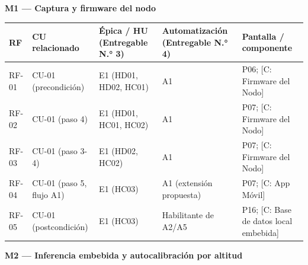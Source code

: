\documentclass[11pt,a4paper]{article}
\begin{document}
\textbf{M1 --- Captura y firmware del nodo}

{\small
\begin{longtable}[]{@{}
  >{\raggedright\arraybackslash}p{}
  >{\raggedright\arraybackslash}p{}
  >{\raggedright\arraybackslash}p{}
  >{\raggedright\arraybackslash}p{}
  >{\raggedright\arraybackslash}p{}@{}}
\toprule\noalign{}
\begin{minipage}[b]{\linewidth}\raggedright
RF
\end{minipage} & \begin{minipage}[b]{\linewidth}\raggedright
CU relacionado
\end{minipage} & \begin{minipage}[b]{\linewidth}\raggedright
Épica / HU (Entregable N.° 3)
\end{minipage} & \begin{minipage}[b]{\linewidth}\raggedright
Automatización (Entregable N.° 4)
\end{minipage} & \begin{minipage}[b]{\linewidth}\raggedright
Pantalla / componente
\end{minipage} \\
\midrule\noalign{}
\endhead
\bottomrule\noalign{}
\endlastfoot
RF-01 & CU-01 (precondición) & E1 (HD01, HD02, HC01) & A1 & P06; {[}C: Firmware del Nodo{]} \\
RF-02 & CU-01 (paso 4) & E1 (HD01, HC01, HC02) & A1 & P07; {[}C: Firmware del Nodo{]} \\
RF-03 & CU-01 (paso 3-4) & E1 (HD02, HC02) & A1 & P07; {[}C: Firmware del Nodo{]} \\
RF-04 & CU-01 (paso 5, flujo A1) & E1 (HC03) & A1 (extensión propuesta) & P07; {[}C: App Móvil{]} \\
RF-05 & CU-01 (postcondición) & E1 (HC03) & Habilitante de A2/A5 & P16; {[}C: Base de datos local embebida{]} \\
\end{longtable}
}

\textbf{M2 --- Inferencia embebida y autocalibración por altitud}
\end{document}
